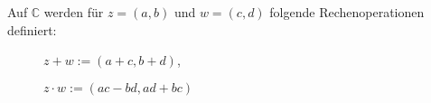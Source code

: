 Auf $\mathbb{C}$ werden für $z = (a, b)$ und $w = (c, d)$ folgende Rechenoperationen definiert:
\begin{description}
    \item[] $z+w := (a+c, b+d)$,
    \item[] $z \cdot w := (ac - bd, ad+bc)$
\end{description}